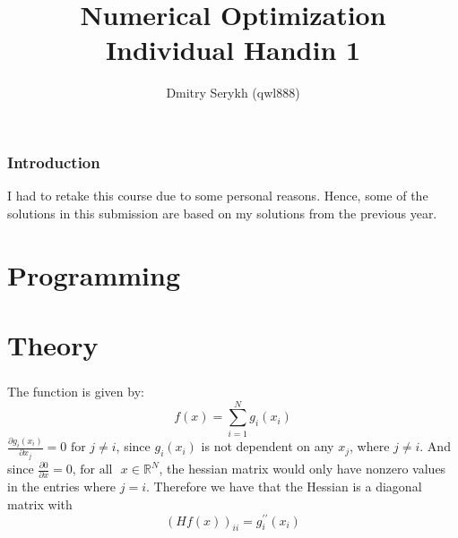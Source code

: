 \documentclass[a4paper]{article}
\title{\vspace{-5cm} Numerical Optimization \\ Individual Handin 1}
\author{Dmitry Serykh (qwl888)}
\begin{document}
\maketitle
\section*{Introduction}
I had to retake this course due to some personal reasons.
Hence, some of the solutions in this submission are based on my solutions from
the previous year.

\part{Programming}

\part{Theory}
\section{}
\label{t1}
The function is given by:
\[
f(x)=\sum_{i=1}^{N} g_{i}\left(x_{i}\right)
\]
$\frac{\partial g_{i}(x_{i})}{\partial x_j} = 0\text{ for }j\neq i$, since
$g_i(x_i)$ is not dependent on any $x_j$, where $j \neq i$.
And since $\frac{\partial 0}{\partial x} = 0\text{, for all }$ $x \in
\mathbb{R}^{N}$, the hessian matrix would only have nonzero values in the
entries where $j=i$. Therefore we have that the Hessian is a diagonal matrix with 
\[
(H f(x))_{i  i}=g_{i}^{\prime \prime}\left(x_{i}\right)
\]
\section{}
\label{t2}
\end{document}
